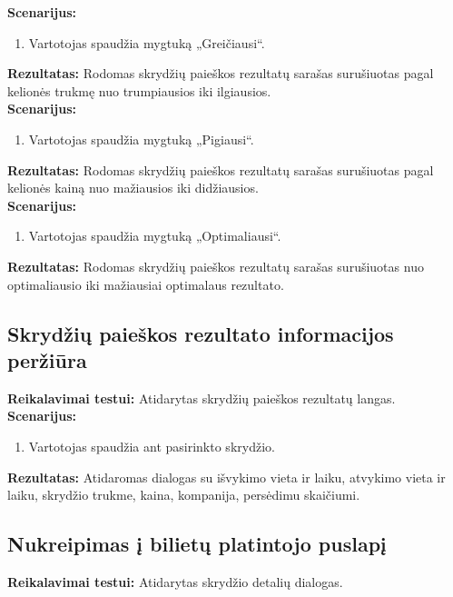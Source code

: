 \documentclass{VUMIFPSkursinis}
\begin{document}
            \noindent\textbf{Scenarijus:}
                \begin{enumerate}
                    \item Vartotojas spaudžia mygtuką „Greičiausi“.
                \end{enumerate}
            \textbf{Rezultatas:} Rodomas skrydžių paieškos rezultatų sarašas surušiuotas pagal kelionės trukmę nuo trumpiausios iki ilgiausios.\\

            \noindent\textbf{Scenarijus:}
                \begin{enumerate}
                    \item Vartotojas spaudžia mygtuką „Pigiausi“.
                \end{enumerate}
            \textbf{Rezultatas:} Rodomas skrydžių paieškos rezultatų sarašas surušiuotas pagal kelionės kainą nuo mažiausios iki didžiausios.\\

            \noindent\textbf{Scenarijus:}
                \begin{enumerate}
                    \item Vartotojas spaudžia mygtuką „Optimaliausi“.
                \end{enumerate}
            \textbf{Rezultatas:} Rodomas skrydžių paieškos rezultatų sarašas surušiuotas nuo optimaliausio iki mažiausiai optimalaus rezultato.\\

        \subsection{Skrydžių paieškos rezultato informacijos peržiūra}
            \noindent\textbf{Reikalavimai testui:} Atidarytas skrydžių paieškos rezultatų langas.\\

            \noindent\textbf{Scenarijus:}
                \begin{enumerate}
                    \item Vartotojas spaudžia ant pasirinkto skrydžio.
                \end{enumerate}
            \textbf{Rezultatas:} Atidaromas dialogas su išvykimo vieta ir laiku, atvykimo vieta ir laiku, skrydžio trukme, kaina, kompanija, persėdimu skaičiumi.\\

        \subsection{Nukreipimas į bilietų platintojo puslapį}
            \noindent\textbf{Reikalavimai testui:} Atidarytas skrydžio detalių dialogas. \\
\end{document}
